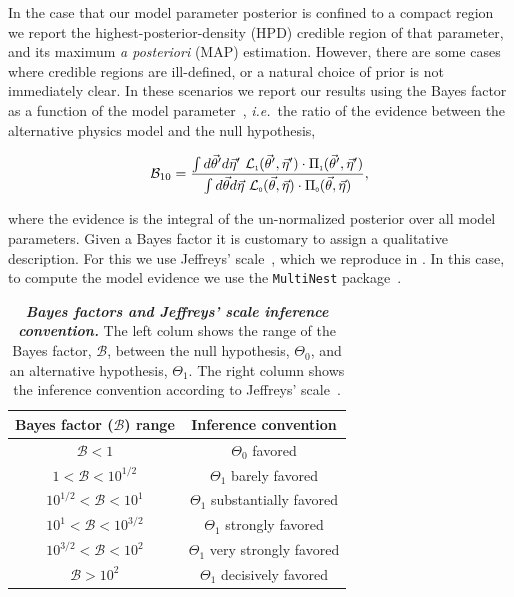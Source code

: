 In the case that our model parameter posterior is confined to a compact region we report the highest-posterior-density (HPD) credible region of that parameter, and its maximum {\it{}a posteriori} (MAP) estimation.
However, there are some cases where credible regions are ill-defined, or a natural choice of prior is not immediately clear.
In these scenarios we report our results using the Bayes factor as a function of the model parameter~\cite{Trotta:2017wnx}, {\it i.e.}\ the ratio of the evidence between the alternative physics model and the null hypothesis,
\begin{linenomath*}
	\begin{equation}
	\mathcal{B}_{1 0} = \frac{\int d\vec\theta' d\vec\eta'~\mathcal{L}_\texttt{\tiny{1}}(\vec\theta',\vec\eta')\cdot\Pi_\texttt{\tiny{1}}(\vec\theta',\vec\eta')}{\int d\vec\theta d\vec\eta~\mathcal{L}_\texttt{\tiny{0}}(\vec\theta, \vec\eta)\cdot\Pi_\texttt{\tiny{0}}(\vec\theta,\vec\eta)},
	\label{eq:bayes_factor}
	\end{equation}
\end{linenomath*}
where the evidence is the integral of the un-normalized posterior over all model parameters.
Given a Bayes factor it is customary to assign a qualitative description.
For this we use Jeffreys' scale~\cite{jeffreys1998theory}, which we reproduce in .
In this case, to compute the model evidence we use the \texttt{MultiNest} package~\cite{Feroz:2013hea}.

\begin{table}
	\begin{center}
		\begin{tabular}{c|c}
			\hline
			Bayes factor ($\mathcal{B}$) range & Inference convention \\
			\hline
			$\mathcal{B} <1$ & $\Theta_0$ favored \\
			$1<\mathcal{B}<10^{1/2}$ & $\Theta_1$ barely favored\\
			$10^{1/2}<\mathcal{B}<10^{1}$ & $\Theta_1$ substantially favored\\
			$10^{1}<\mathcal{B}<10^{3/2}$ & $\Theta_1$ strongly favored\\
			$10^{3/2}<\mathcal{B}<10^{2}$ & $\Theta_1$ very strongly favored\\
			$\mathcal{B} > 10^{2} $ & $\Theta_1$ decisively favored\\
			\hline
		\end{tabular}
	\end{center}
	\internallinenumbers
	\caption{\textit{\textbf{Bayes factors and Jeffreys' scale inference convention.}}
		The left colum shows the range of the Bayes factor, $\mathcal{B}$, between the null hypothesis, $\Theta_0$, and an alternative hypothesis, $\Theta_1$.
		The right column shows the inference convention according to Jeffreys' scale~\cite{jeffreys1998theory}.}
	\label{tbl:jeffrey}
\end{table}

